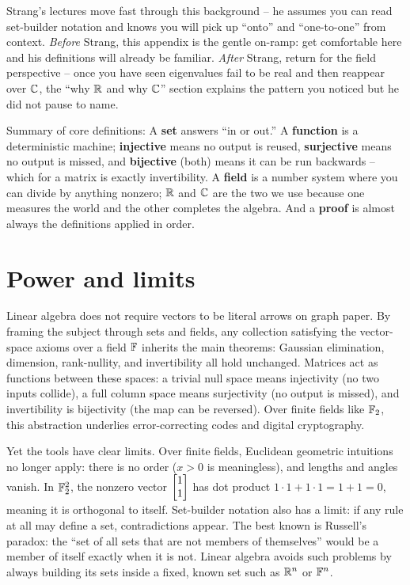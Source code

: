 \begin{strangbox}
Strang's lectures move fast through this background -- he assumes you can read set-builder
notation and knows you will pick up ``onto'' and ``one-to-one'' from context.
\emph{Before} Strang, this appendix is the gentle on-ramp: get comfortable here and his
definitions will already be familiar. \emph{After} Strang,
return for the field perspective -- once you have seen eigenvalues fail to be real and then
reappear over $\mathbb{C}$, the ``why $\mathbb{R}$ and why $\mathbb{C}$'' section explains the pattern you noticed
but he did not pause to name.
\end{strangbox}

\begin{focusbox}
Summary of core definitions: A \textbf{set} answers ``in or out.'' A
\textbf{function} is a deterministic machine; \textbf{injective} means no output is reused,
\textbf{surjective} means no output is missed, and \textbf{bijective} (both) means it can
be run backwards -- which for a matrix is exactly invertibility. A \textbf{field} is a
number system where you can divide by anything nonzero; $\mathbb{R}$ and $\mathbb{C}$ are the two we use
because one measures the world and the other completes the algebra. And a \textbf{proof}
is almost always the definitions applied in order.
\end{focusbox}

\section{Power and limits}

Linear algebra does not require vectors to be literal arrows on graph paper.
By framing the subject through sets and fields, any collection satisfying the
vector-space axioms over a field $\mathbb{F}$ inherits the main theorems: Gaussian
elimination, dimension, rank-nullity, and invertibility all hold unchanged.
Matrices act as functions between these spaces: a trivial null space means
injectivity (no two inputs collide), a full column space means surjectivity (no
output is missed), and invertibility is bijectivity (the map can be reversed).
Over finite fields like $\mathbb{F}_2$, this abstraction underlies error-correcting codes
and digital cryptography.

Yet the tools have clear limits. Over finite fields, Euclidean geometric intuitions
no longer apply: there is no order ($x > 0$ is meaningless), and lengths and
angles vanish. In $\mathbb{F}_2^2$, the nonzero vector $\begin{bmatrix}1\\1\end{bmatrix}$ has dot product
$1\cdot 1 + 1\cdot 1 = 1 + 1 = 0$, meaning it is orthogonal to itself. Set-builder
notation also has a limit: if any rule at all may define a set, contradictions appear. The
best known is Russell's paradox: the ``set of all sets that are not members of themselves''
would be a member of itself exactly when it is not. Linear algebra avoids such problems by
always building its sets inside a fixed, known set such as $\mathbb{R}^n$ or $\mathbb{F}^n$.

